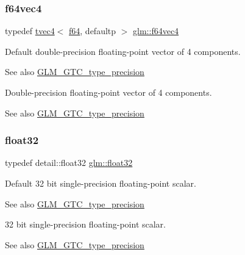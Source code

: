 \subsubsection{\texorpdfstring{f64vec4}{f64vec4}}
{\footnotesize\ttfamily typedef \hyperlink{structglm_1_1tvec4}{tvec4}$<$ \hyperlink{group__gtc__type__precision_ga2bba392e555124b36cde6abba349bab3}{f64}, defaultp $>$ \hyperlink{group__gtc__type__precision_ga9d896f484039b22873e7bfb9e06f7b47}{glm\+::f64vec4}}

Default double-\/precision floating-\/point vector of 4 components. \begin{DoxySeeAlso}{See also}
\hyperlink{group__gtc__type__precision}{G\+L\+M\+\_\+\+G\+T\+C\+\_\+type\+\_\+precision}
\end{DoxySeeAlso}
Double-\/precision floating-\/point vector of 4 components. \begin{DoxySeeAlso}{See also}
\hyperlink{group__gtc__type__precision}{G\+L\+M\+\_\+\+G\+T\+C\+\_\+type\+\_\+precision} 
\end{DoxySeeAlso}
\mbox{\label{group__gtc__type__precision_ga814f2f65354b6588b067cc5c67a6b340}} 
\subsubsection{\texorpdfstring{float32}{float32}}
{\footnotesize\ttfamily typedef detail\+::float32 \hyperlink{group__gtc__type__precision_ga814f2f65354b6588b067cc5c67a6b340}{glm\+::float32}}

Default 32 bit single-\/precision floating-\/point scalar. \begin{DoxySeeAlso}{See also}
\hyperlink{group__gtc__type__precision}{G\+L\+M\+\_\+\+G\+T\+C\+\_\+type\+\_\+precision}
\end{DoxySeeAlso}
32 bit single-\/precision floating-\/point scalar. \begin{DoxySeeAlso}{See also}
\hyperlink{group__gtc__type__precision}{G\+L\+M\+\_\+\+G\+T\+C\+\_\+type\+\_\+precision} 
\end{DoxySeeAlso}
\mbox{\label{group__gtc__type__precision_ga642737ae3e7c434b366f2191e6944bf2}} 
